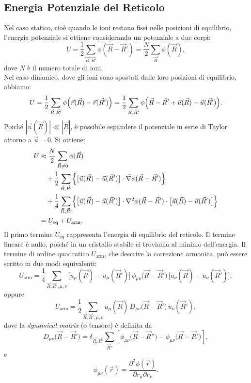 \subsection*{Energia Potenziale del Reticolo}
Nel caso statico, cioè quando le ioni restano fissi nelle posizioni di equilibrio, l'energia potenziale si ottiene considerando un potenziale a due corpi:
\[
U = \frac{1}{2}\sum_{\vec{R},\vec{R}'} \phi(\vec{R}-\vec{R}') = \frac{N}{2}\sum_{\vec{R}} \phi(\vec{R}),
\]
dove \(N\) è il numero totale di ioni.\\
Nel caso dinamico, dove gli ioni sono spostati dalle loro posizioni di equilibrio, abbiamo:
\[
U = \frac{1}{2}\sum_{\vec{R},\vec{R}'} \phi\Bigl(\vec{r}(\vec{R}) - \vec{r}(\vec{R}')\Bigr)
= \frac{1}{2}\sum_{\vec{R},\vec{R}'} \phi\Bigl(\vec{R} - \vec{R}' + \vec{u}(\vec{R}) - \vec{u}(\vec{R}')\Bigr).
\]
Poiché \(|\vec{u}(\vec{R})| \ll |\vec{R}|\), è possibile espandere il potenziale in serie di Taylor attorno a \(\vec{u}=0\). Si ottiene:
\begin{equation}
\begin{split}
    U &\approx \frac{N}{2}\sum_{\vec{R} \neq 0}\phi(\vec{R}) \\
    &\quad + \frac{1}{2}\sum_{\vec{R},\vec{R}'} \Bigl\{ \bigl[\vec{u}(\vec{R}) - \vec{u}(\vec{R}')\bigr] \cdot \vec{\nabla} \phi(\vec{R}-\vec{R}') \Bigr\} \\
    &\quad + \frac{1}{4}\sum_{\vec{R},\vec{R}'} \Bigl\{ \bigl[\vec{u}(\vec{R}) - \vec{u}(\vec{R}')\bigr] \cdot \nabla^2 \phi(\vec{R}-\vec{R}') \cdot \bigl[\vec{u}(\vec{R}) - \vec{u}(\vec{R}')\bigr] \Bigr\} \\
    &= U_{\text{eq}} + U_{\text{arm}}.
\end{split}
\end{equation}
Il primo termine \(U_{\text{eq}}\) rappresenta l'energia di equilibrio del reticolo. Il termine lineare è nullo, poiché in un cristallo stabile ci troviamo al minimo dell'energia. Il termine di ordine quadratico \(U_{\text{arm}}\), che descrive la correzione armonica, può essere scritto in due modi equivalenti:
\begin{equation}
    U_{\text{arm}} = \frac{1}{4}\sum_{\vec{R},\vec{R}',\mu,\nu} \bigl[u_{\mu}(\vec{R}) - u_{\mu}(\vec{R}')\bigr]\, \phi_{\mu\nu}\bigl(\vec{R}-\vec{R}'\bigr)\, \bigl[u_{\nu}(\vec{R}) - u_{\nu}(\vec{R}')\bigr],
\end{equation}
oppure
\begin{equation}
    U_{\text{arm}} = \frac{1}{2}\sum_{\vec{R},\vec{R}',\mu,\nu} u_{\mu}(\vec{R})\, D_{\mu\nu}\bigl(\vec{R}-\vec{R}'\bigr)\, u_{\nu}(\vec{R}'),
\end{equation}
dove la \emph{dynamical matrix} (o tensore) è definita da
\[
D_{\mu\nu}\bigl(\vec{R}-\vec{R}'\bigr) = \delta_{\vec{R},\vec{R}'} \sum_{\vec{R}''} \left[\phi_{\mu\nu}\bigl(\vec{R}-\vec{R}'') - \phi_{\mu\nu}\bigl(\vec{R}-\vec{R}'\bigr)\right],
\]
e
\[
\phi_{\mu\nu}(\vec{r}) = \frac{\partial^2 \phi(\vec{r})}{\partial r_\mu \partial r_\nu}.
\]

